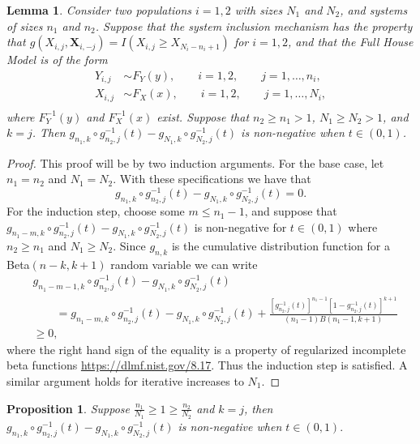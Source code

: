 \documentclass[12pt]{article}
\newtheorem{lemma}[theorem]{Lemma}
\newtheorem{prop}[theorem]{Proposition}
\begin{document}
\begin{lemma} \label{lem:recursion}
Consider two populations $i = 1,2$ with sizes $N_1$ and $N_2$, and systems of sizes $n_1$ and $n_2$. 
Suppose that the system inclusion mechanism has the property that $g(X_{i,j},\textbf{X}_{i,-j}) = I(X_{i,j} \geq X_{N_i-n_i+1})$ for $i = 1,2$, and that the Full House Model is of the form 
\begin{align*}
  Y_{i,j} &\sim F_Y(y), \qquad i = 1,2, \qquad j = 1,\ldots,n_i, \\
  X_{i,j} &\sim F_X(x), \qquad i = 1,2, \qquad j = 1,\ldots,N_i, \\
\end{align*}
where $F_Y^{-1}(y)$ and $F_X^{-1}(x)$ exist. Suppose that $n_2 \geq n_1 > 1$, $N_1 \geq N_2 > 1$, and $k=j$. Then $g_{n_1, k} \circ g_{n_2, j}^{-1}(t) - g_{N_1, k} \circ g_{N_2, j}^{-1}(t)$ is non-negative when $t \in (0,1)$.	
\end{lemma}

\begin{proof}
	This proof will be by two induction arguments. For the base case, let $n_1 = n_2$ and $N_1 = N_2$. With these specifications we have that 
	$$
	g_{n_1, k} \circ g_{n_2, j}^{-1}(t) - g_{N_1, k} \circ g_{N_2, j}^{-1}(t) = 0.
	$$
	For the induction step, choose some $m \leq n_1 - 1$, and suppose that $g_{n_1 -m, k} \circ g_{n_2, j}^{-1}(t) - g_{N_1, k} \circ g_{N_2, j}^{-1}(t)$ is non-negative for $t \in (0,1)$ where $n_2 \geq n_1$ and $N_1 \geq N_2$. Since $g_{n, k}$ is the cumulative distribution function for a Beta$(n-k,k+1)$ random variable we can write
	\begin{align*}
		&g_{n_1-m-1, k} \circ g_{n_2, j}^{-1}(t) - g_{N_1, k} \circ g_{N_2, j}^{-1}(t) \\
		  &\qquad= g_{n_1-m, k} \circ g_{n_2, j}^{-1}(t) - g_{N_1, k} \circ g_{N_2, j}^{-1}(t) + \frac{\left[g_{n_2, j}^{-1}(t)\right]^{n_1-1}\left[1 - g_{n_2, j}^{-1}(t)\right]^{k+1}}{(n_1-1)B(n_1-1,k+1)} \\
		  &\geq 0,
	\end{align*}
	where the right hand sign of the equality is a property of regularized incomplete beta functions \url{https://dlmf.nist.gov/8.17}. Thus the induction step is satisfied. A similar argument holds for iterative increases to $N_1$.
\end{proof}



\newpage

\begin{prop} \label{prop:condition}
	Suppose $\frac{n_1}{N_1} \geq 1 \geq \frac{n_2}{N_2}$ and $k = j$, then $g_{n_1, k} \circ g_{n_2, j}^{-1}(t) - g_{N_1, k} \circ g_{N_2, j}^{-1}(t)$ is non-negative when $t \in (0,1).$
\end{prop}
	
\end{document}

